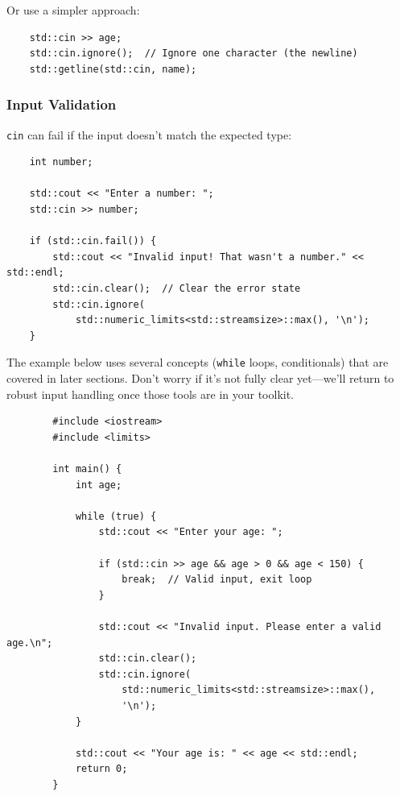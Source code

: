 Or use a simpler approach:

\begin{lstlisting}
	std::cin >> age;
	std::cin.ignore();  // Ignore one character (the newline)
	std::getline(std::cin, name);
\end{lstlisting}

\subsubsection{Input Validation}

\texttt{cin} can fail if the input doesn't match the expected type:

\begin{lstlisting}
	int number;
	
	std::cout << "Enter a number: ";
	std::cin >> number;
	
	if (std::cin.fail()) {
		std::cout << "Invalid input! That wasn't a number." << std::endl;
		std::cin.clear();  // Clear the error state
		std::cin.ignore(
			std::numeric_limits<std::streamsize>::max(), '\n');
	}
\end{lstlisting}

\begin{remark}
	The example below uses several concepts (\texttt{while} loops, conditionals) that are covered in later sections. Don't worry if it's not fully clear yet—we'll return to robust input handling once those tools are in your toolkit.
\end{remark}

\begin{example}{\leavevmode}

	\begin{lstlisting}
		#include <iostream>
		#include <limits>
		
		int main() {
			int age;
			
			while (true) {
				std::cout << "Enter your age: ";
				
				if (std::cin >> age && age > 0 && age < 150) {
					break;  // Valid input, exit loop
				}
				
				std::cout << "Invalid input. Please enter a valid age.\n";
				std::cin.clear();
				std::cin.ignore(
					std::numeric_limits<std::streamsize>::max(),
					'\n');
			}
			
			std::cout << "Your age is: " << age << std::endl;
			return 0;
		}
	\end{lstlisting}
\end{example}

